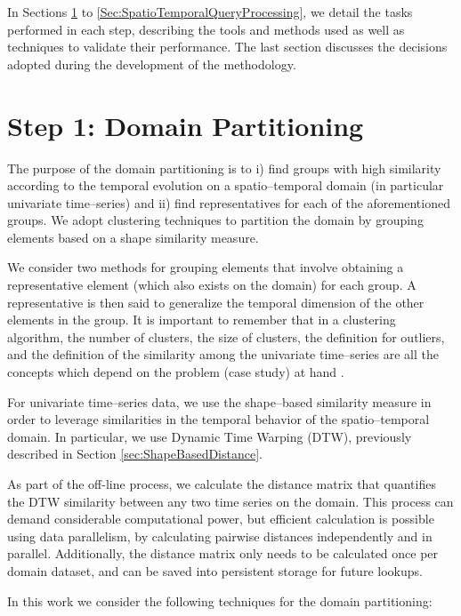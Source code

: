 In Sections \ref{Sec:DomainPartitioning} to \ref{Sec:SpatioTemporalQueryProcessing}, we detail the tasks performed in each step, describing the tools and methods used as well as techniques to validate their performance. The last section discusses the decisions adopted during the development of the methodology.

\section{Step 1: Domain Partitioning}
\label{Sec:DomainPartitioning}

The purpose of the domain partitioning is to i) find groups with high similarity according to the temporal evolution on a spatio--temporal domain (in particular univariate time--series) and ii) find representatives for each of the aforementioned groups. We adopt clustering techniques to partition the domain by grouping elements based on a shape similarity measure. 

We consider two methods for grouping elements that involve obtaining a representative element (which also exists on the domain) for each group. A representative is then said to generalize the temporal dimension of the other elements in the group. It is important to remember that in a clustering algorithm, the number of clusters, the size of clusters, the definition for outliers, and the definition of the similarity among the univariate time--series are all the concepts which depend on the problem (case study) at hand \cite{Aghabozorgi2015}.

For univariate time--series data, we use the shape--based similarity measure in order to leverage similarities in the temporal behavior of the spatio--temporal domain. In particular, we use Dynamic Time Warping (DTW), previously described in Section \ref{sec:ShapeBasedDistance}.

As part of the off-line process, we calculate the distance matrix that quantifies the DTW similarity between any two time series on the domain. This process can demand considerable computational power, but efficient calculation is possible using data parallelism, by calculating pairwise distances independently and in parallel. Additionally, the distance matrix only needs to be calculated once per domain dataset, and can be saved into persistent storage for future lookups.

In this work we consider the following techniques for the domain partitioning:

